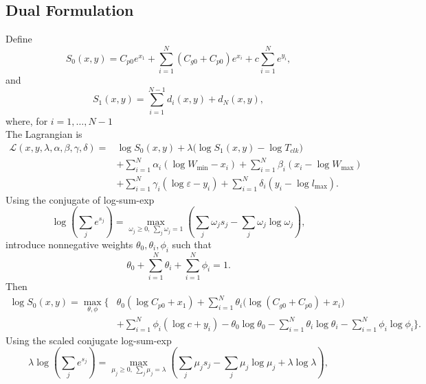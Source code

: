 \documentclass{article}
\begin{document}
\subsection{Dual Formulation}
Define
\begin{equation} \nonumber
	S_0(x,y)
	=
	C_{p0}e^{x_1}
	+\sum_{i=1}^N (C_{g0}+C_{p0})e^{x_i}
	+c\sum_{i=1}^N e^{y_i},
	\label{eq:S0}
\end{equation}
and
\begin{equation} \nonumber
	S_1(x,y)=\sum_{i=1}^{N-1} d_i(x,y)+d_N(x,y),
	\label{eq:S1}
\end{equation}
where, for \(i=1,\dots,N-1\)\\
The Lagrangian is
\begin{equation}
	\begin{aligned}
		\mathcal{L}(x,y,\lambda,\alpha,\beta,\gamma,\delta)
		={} &
		\log S_0(x,y)
		+\lambda\big(\log S_1(x,y)-\log T_{clk}\big) \\
		    & +\sum_{i=1}^N \alpha_i(\log W_{\min}-x_i)
		+\sum_{i=1}^N \beta_i(x_i-\log W_{\max})              \\
		    & +\sum_{i=1}^N \gamma_i(\log \varepsilon-y_i)
		+\sum_{i=1}^N \delta_i(y_i-\log l_{\max}).
	\end{aligned}
	\label{eq:Lagrangian}
\end{equation}
Using the conjugate of log-sum-exp
\begin{equation} \nonumber
	\log\!\left(\sum_j e^{s_j}\right)
	=
	\max_{\omega_j\ge 0,\ \sum_j \omega_j=1}
	\left(
	\sum_j \omega_j s_j-\sum_j \omega_j\log\omega_j
	\right),
	\label{eq:logsumexp1}
\end{equation}
introduce nonnegative weights \(\theta_0,\theta_i,\phi_i\) such that
\begin{equation} \nonumber
	\theta_0+\sum_{i=1}^N \theta_i+\sum_{i=1}^N \phi_i=1.
	\label{eq:theta-phi-sum}
\end{equation}
Then
\begin{equation}
	\begin{aligned}
		\log S_0(x,y)
		=
		\max_{\theta,\phi}\Bigg\{
		 & \theta_0(\log C_{p0}+x_1)
		+\sum_{i=1}^N \theta_i\big(\log(C_{g0}+C_{p0})+x_i\big) \\
		 & +\sum_{i=1}^N \phi_i(\log c+y_i)
		-\theta_0\log\theta_0
		-\sum_{i=1}^N \theta_i\log\theta_i
		-\sum_{i=1}^N \phi_i\log\phi_i
		\Bigg\}.
	\end{aligned}
	\label{eq:S0-dual}
\end{equation}
Using the scaled conjugate log-sum-exp
\begin{equation} \nonumber
	\lambda\log\!\left(\sum_j e^{s_j}\right)
	=
	\max_{\mu_j\ge 0,\ \sum_j\mu_j=\lambda}
	\left(
	\sum_j \mu_j s_j
	-\sum_j \mu_j\log\mu_j
	+\lambda\log\lambda
	\right),
	\label{eq:logsumexp2}
\end{equation}
\end{document}
